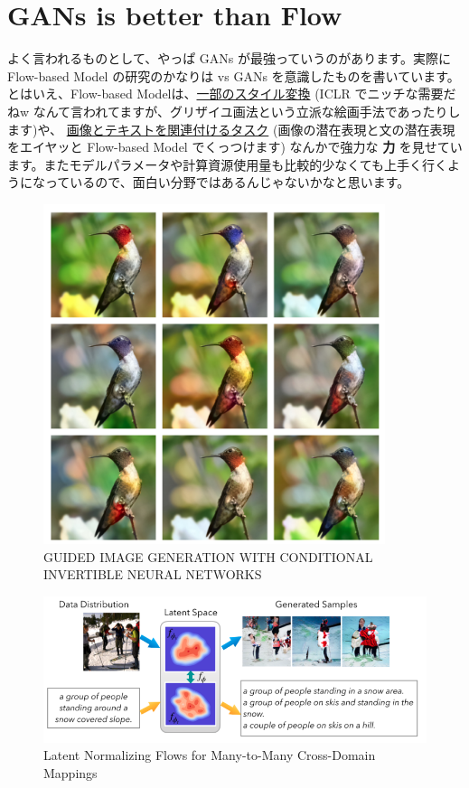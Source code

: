 \documentclass[dvipdfmx]{article}
\begin{document}
\section{GANs is better than Flow}
\label{sec:orge4ae2c0}
よく言われるものとして、やっぱ GANs が最強っていうのがあります。実際に Flow-based Model の研究のかなりは vs GANs を意識したものを書いています。\\
とはいえ、Flow-based Modelは、\href{https://arxiv.org/abs/1907.02392}{一部のスタイル変換} (ICLR でニッチな需要だねw なんて言われてますが、グリザイユ画法という立派な絵画手法であったりします)や、 \href{https://openreview.net/forum?id=SJxE8erKDH}{画像とテキストを関連付けるタスク} (画像の潜在表現と文の潜在表現をエイヤッと Flow-based Model でくっつけます) なんかで強力な \textbf{力} を見せています。またモデルパラメータや計算資源使用量も比較的少なくても上手く行くようになっているので、面白い分野ではあるんじゃないかなと思います。\\

\begin{figure}[htbp]
\centering
\includegraphics[width=10cm]{./cinn.png}
\caption{GUIDED IMAGE GENERATION WITH CONDITIONAL INVERTIBLE NEURAL NETWORKS}
\end{figure}

\begin{figure}[htbp]
\centering
\includegraphics[width=.9\linewidth]{./connect.png}
\caption{Latent Normalizing Flows for Many-to-Many Cross-Domain Mappings}
\end{figure}
\end{document}

